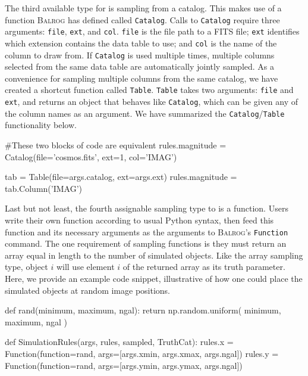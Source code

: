 \documentclass[11pt]{book}
\newcommand{\codett}[1]{\lstinline{#1}}
\newcommand{\py}{Python}
\newcommand{\balrog}{\textsc{Balrog}}
\begin{document}
The third available type for \simrules{} is sampling from a catalog. 
This makes use of a function \balrog{} has defined called \codett{Catalog}. 
Calls to \codett{Catalog} require three arguments: \codett{file}, \codett{ext}, and \codett{col}.
\codett{file} is the file path to a FITS file;
\codett{ext} identifies which extension contains the data table to use; and
\codett{col} is the name of the column to draw from.
If \codett{Catalog} is used multiple times,
multiple columns selected from the same data table are automatically jointly sampled.
As a convenience for sampling multiple columns from the same catalog, 
we have created a shortcut function called \codett{Table}.
\codett{Table} takes two arguments: \codett{file} and \codett{ext},
and returns an object that behaves like \codett{Catalog},
which can be given any of the column names as an argument.
We have summarized the \codett{Catalog}/\codett{Table} functionality below.

\begin{code}
#These two blocks of code are equivalent
rules.magnitude = Catalog(file='cosmos.fits', ext=1, col='IMAG')

tab = Table(file=args.catalog, ext=args.ext)
rules.magnitude = tab.Column('IMAG')
\end{code}

Last but not least, the fourth assignable sampling type to \simrules{} is a function. 
Users write their own function according to usual \py{} syntax,
then feed this function and its necessary arguments as the arguments to
\balrog{}'s \codett{Function} command. 
The one requirement of sampling functions is they must return an array equal in 
length to the number of simulated objects.
Like the array sampling type, object $i$ will use element $i$ of the returned array as its truth parameter.
Here, we provide an example code snippet, illustrative of how one could place the simulated objects at random image positions. 

\begin{code}
def rand(minimum, maximum, ngal):
    return np.random.uniform( minimum, maximum, ngal )

def SimulationRules(args, rules, sampled, TruthCat):
    rules.x = Function(function=rand, args=[args.xmin, args.xmax, args.ngal])
    rules.y = Function(function=rand, args=[args.ymin, args.ymax, args.ngal])
\end{code}
\end{document}
